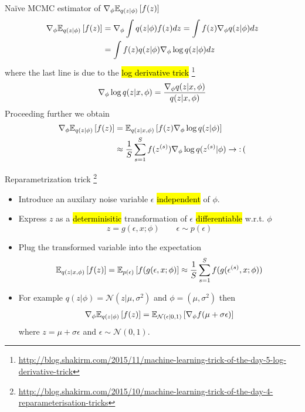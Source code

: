 \documentclass[unicode,11pt]{beamer}
\begin{document}
\begin{frame}{Na\"ive MCMC estimator of $\grad_\phi \E{q(z|\phi)}{f(z)}$}
  \begin{align*}
    \grad_\phi \E{q(z|\phi)}{f(z)}
    &= \grad_\phi \int q(z|\phi) f(z) dz
     = \int f(z) \grad_\phi q(z|\phi) dz \\
    &= \int f(z) q(z|\phi) \grad_\phi \log q(z|\phi) dz
  \end{align*}
  where the last line is due to the \hl{log derivative trick}
  \footnote{%
    \url{http://blog.shakirm.com/2015/11/machine-learning-trick-of-the-day-5-log-derivative-trick}}
  $$
  \nabla_\phi \log q(z|x, \phi) = \frac{\nabla_\phi q(z|x, \phi)}{q(z|x, \phi)}
  $$
  Proceeding further we obtain
  \begin{align*}
    \grad_\phi \E{q(z|\phi)}{f(z)}
    &= \E{q(z|x, \phi)}{f(z) \grad_\phi \log q(z|\phi)} \\
    &\approx \frac{1}{S} \sum\limits_{s = 1}^S f(z^{(s)}) \grad_\phi \log q(z^{(s)}|\phi)
    \to \op{:(}
  \end{align*}

\end{frame}


\begin{frame}{Reparametrization trick%
  \footnote{\url{http://blog.shakirm.com/2015/10/machine-learning-trick-of-the-day-4-reparameterisation-tricks}}}
  \begin{itemize}
  \item Introduce an auxilary noise variable $\epsilon$ \hl{independent} of
    $\phi$.
  \item Express $z$ as a \hl{determinisitic} transformation of $\epsilon$
    \hl{differentiable} w.r.t. $\phi$
    $$
    z = g(\epsilon, x; \phi)
    \qquad
    \epsilon \sim p(\epsilon)
    $$
  \item Plug the transformed variable into the expectation
    $$
    \E{q(z|x, \phi)}{f(z)}
    = \E{p(\epsilon)}{f(g(\epsilon, x; \phi)}
    \approx \frac{1}{S} \sum\limits_{s = 1}^S f(g(\epsilon^{(s)}, x; \phi))
    $$
  \item For example $q(z|\phi) = \mathcal{N}(z|\mu, \sigma^2)$ and
    $\phi = (\mu, \sigma^2)$ then
    \begin{align*}
      \grad_\phi \E{q(z|\phi)}{f(z)}
      = \E{\mathcal{N}(\epsilon|0, 1)}{\grad_\phi f(\mu + \sigma \epsilon)}
    \end{align*}
    where $z = \mu + \sigma\epsilon$ and $\epsilon \sim \mathcal{N}(0, 1)$.
  \end{itemize}
\end{frame}
\end{document}
